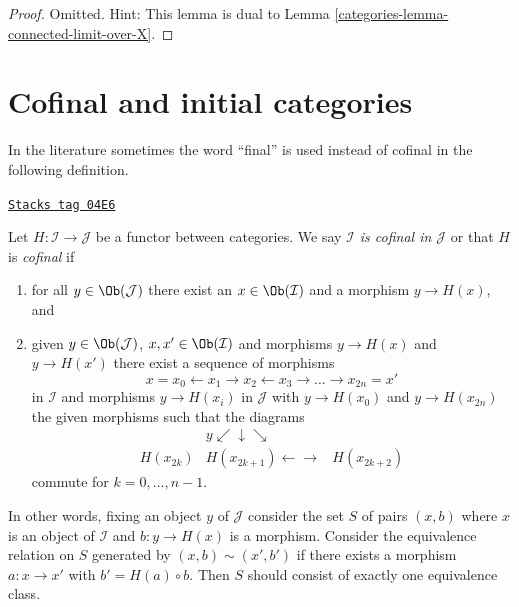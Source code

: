 \begin{proof}

Omitted. Hint: This lemma is dual to Lemma \ref{categories-lemma-connected-limit-over-X}.
\end{proof}

\section{Cofinal and initial categories}
\label{categories-section-cofinal}
In the literature sometimes the word ``final'' is used instead of cofinal
in the following definition.

\begin{definition}[Cofinal]
\label{categories-definition-cofinal}
\href{https://stacks.math.columbia.edu/tag/04E6}{\texttt{Stacks tag 04E6}}

Let $H : \mathcal{I} \to \mathcal{J}$ be a functor between categories.
We say {\it $\mathcal{I}$ is cofinal in $\mathcal{J}$} or that
$H$ is {\it cofinal} if
\begin{enumerate}
\item for all $y \in \Ob(\mathcal{J})$ there exist an
$x \in \Ob(\mathcal{I})$ and a morphism $y \to H(x)$, and
\item given $y \in \Ob(\mathcal{J})$, $x, x' \in \Ob(\mathcal{I})$
and morphisms $y \to H(x)$ and $y \to H(x')$ there exist a sequence
of morphisms
$$
x = x_0 \leftarrow x_1 \rightarrow x_2 \leftarrow x_3 \rightarrow \ldots
\rightarrow x_{2n} = x'
$$
in $\mathcal{I}$ and morphisms $y \to H(x_i)$ in $\mathcal{J}$
with $y \to H(x_0)$ and $y \to H(x_{2n})$ the given morphisms
such that the diagrams
$$
\begin{array}{ccc} & y \swarrow\downarrow\searrow &  \\ H(x_{2k}) & H(x_{2k + 1}) \longleftarrow\longrightarrow & H(x_{2k + 2})\end{array}
$$
commute for $k = 0, \ldots, n - 1$.
\end{enumerate}
In other words, fixing an object $y$ of $\mathcal{J}$ consider the
set $S$ of pairs $(x, b)$ where $x$ is an object of $\mathcal{I}$ and
$b : y \to H(x)$ is a morphism. Consider the equivalence relation
on $S$ generated by $(x, b) \sim (x', b')$ if there exists a
morphism $a : x \to x'$ with $b' = H(a) \circ b$. Then $S$ should
consist of exactly one equivalence class.
\end{definition}

